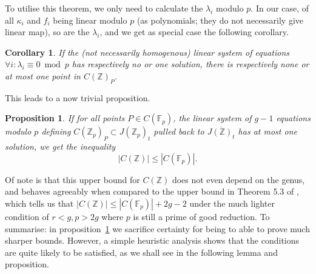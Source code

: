 \documentclass[12pt]{article}
\newcommand{\Z}{\mathbb{Z}}
\newcommand{\F}{\mathbb{F}}
\theoremstyle{plain}
\newtheorem{cor}[thm]{Corollary} %
\newtheorem{prop}[thm]{Proposition} %
\theoremstyle{definition}
\theoremstyle{remark}
\begin{document}
To utilise this theorem, we only need to calculate the $\lambda_i$ modulo $p$. In our case, of all $\kappa_i$ and $f_i$ being linear modulo $p$ (as polynomials; they do not necessarily give linear map), so are the $\lambda_i$, and we get as special case the following corollary.
\begin{cor}
\label{cor:finedixlinear}
If the (not necessarily homogenous) linear system of equations $\forall i: \lambda_i \equiv 0 \bmod p$ has respectively no or one solution, there is respectively none or at most one point in $C(\Z)_P$.
\end{cor}

This leads to a now trivial proposition.
\begin{prop}
\label{prop:linchabauty}
If for all points $P \in C(\F_p)$, the linear system of $g-1$ equations modulo $p$ defining $C(\Z_p)_P \subset J(\Z_p)_t$ pulled back to $\overline{J(\Z)_t}$ has at most one solution, we get the inequality
\[
|C(\Z)| \leq |C(\F_p)|.
\]
\end{prop}

Of note is that this upper bound for $C(\Z)$ does not even depend on the genus, and behaves agreeably when compared to the upper bound in Theorem 5.3 of \citep{poonen12}, which tells us that $|C(\Z)| \leq |C(\F_p)| + 2g-2$ under the much lighter condition of $r < g, p > 2g$ where $p$ is still a prime of good reduction. To summarise: in proposition~\ref{prop:linchabauty} we sacrifice certainty for being to able to prove much sharper bounds. However, a simple heuristic analysis shows that the conditions are quite likely to be satisfied, as we shall see in the following lemma and proposition.
\end{document}
